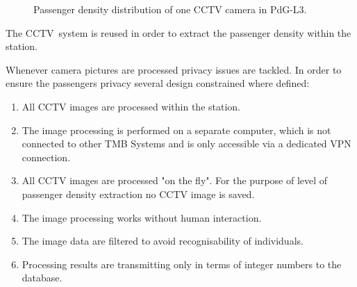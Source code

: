 \begin{figure}[htb]

  \centering

  \hfill

  \caption{Passenger density distribution of one CCTV camera in PdG-L3.}
  \label{fig:PdG-L3_CCTVcameras}

\end{figure}


The CCTV~system is reused in order to extract the passenger density within the station.

Whenever camera pictures are processed privacy issues are tackled. In order to ensure the passengers privacy several design constrained where defined:
\begin{enumerate}
  \item All CCTV images are processed within the station.
  \item The image processing is performed on a separate computer, which is not connected to other TMB Systems and is only accessible via a dedicated VPN connection.
    \item All CCTV images are processed "on the fly". For the purpose of level of passenger density extraction no CCTV image is saved.
  \item The image processing works without human interaction.
  \item The image data are filtered to avoid recognisability of individuals.
  \item Processing results are transmitting only in terms of integer numbers to the database.
\end{enumerate}

